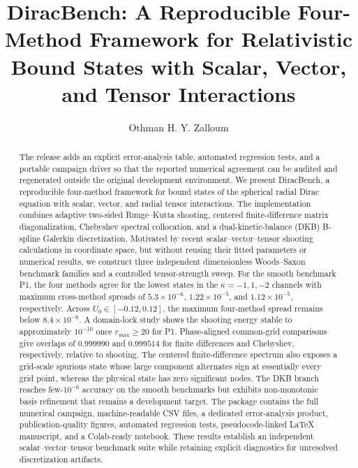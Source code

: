 \documentclass[a4paper,fleqn]{cas-dc}
\begin{document}
\let\WriteBookmarks\relax
\def\floatpagepagefraction{1}
\def\textpagefraction{.001}


\title [mode = title]{DiracBench: A Reproducible Four-Method Framework for Relativistic Bound States with Scalar, Vector, and Tensor Interactions}

\author[1]{Othman H. Y. Zalloum}
\cormark[1]

\begin{abstract}
The release adds an explicit error-analysis table, automated regression tests, and a portable campaign driver so that the reported numerical agreement can be audited and regenerated outside the original development environment.
We present DiracBench, a reproducible four-method framework for bound states of the spherical radial Dirac equation with scalar, vector, and radial tensor interactions. The implementation combines adaptive two-sided Runge--Kutta shooting, centered finite-difference matrix diagonalization, Chebyshev spectral collocation, and a dual-kinetic-balance (DKB) B-spline Galerkin discretization. Motivated by recent scalar--vector--tensor shooting calculations in coordinate space, but without reusing their fitted parameters or numerical results, we construct three independent dimensionless Woods--Saxon benchmark families and a controlled tensor-strength sweep. For the smooth benchmark P1, the four methods agree for the lowest states in the $\kappa=-1,1,-2$ channels with maximum cross-method spreads of $5.3\times10^{-6}$, $1.22\times10^{-5}$, and $1.12\times10^{-5}$, respectively. Across $U_0\in[-0.12,0.12]$, the maximum four-method spread remains below $8.4\times10^{-6}$. A domain-lock study shows the shooting energy stable to approximately $10^{-10}$ once $r_{\max}\ge20$ for P1. Phase-aligned common-grid comparisons give overlaps of $0.999990$ and $0.999514$ for finite differences and Chebyshev, respectively, relative to shooting. The centered finite-difference spectrum also exposes a grid-scale spurious state whose large component alternates sign at essentially every grid point, whereas the physical state has zero significant nodes. The DKB branch reaches few-$10^{-6}$ accuracy on the smooth benchmarks but exhibits non-monotonic basis refinement that remains a development target. The package contains the full numerical campaign, machine-readable CSV files, a dedicated error-analysis product, publication-quality figures, automated regression tests, pseudocode-linked LaTeX manuscript, and a Colab-ready notebook. These results establish an independent scalar--vector--tensor benchmark suite while retaining explicit diagnostics for unresolved discretization artifacts.
\end{abstract}
\end{document}
